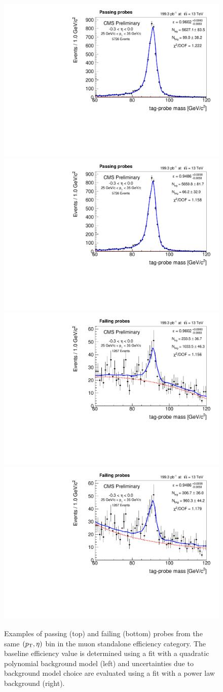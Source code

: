 \begin{figure}
\includegraphics[width=.49\linewidth]{plots/efficiency/examples_musta/passetapt_5.pdf}
\includegraphics[width=.49\linewidth]{plots/efficiency/examples_plbkg/passetapt_5.pdf}
\includegraphics[width=.49\linewidth]{plots/efficiency/examples_musta/failetapt_5.pdf}
\includegraphics[width=.49\linewidth]{plots/efficiency/examples_plbkg/failetapt_5.pdf}
\caption{Examples of passing (top) and failing (bottom) probes from the same $(p_{\mathrm{T}},\eta)$ bin in the muon standalone efficiency category. The baseline efficiency value is determined using a fit with a quadratic polynomial background model (left) and uncertainties due to background model choice are evaluated using a fit with a power law background (right).}
\label{fig:eff:musta:fitexample}
\end{figure}
